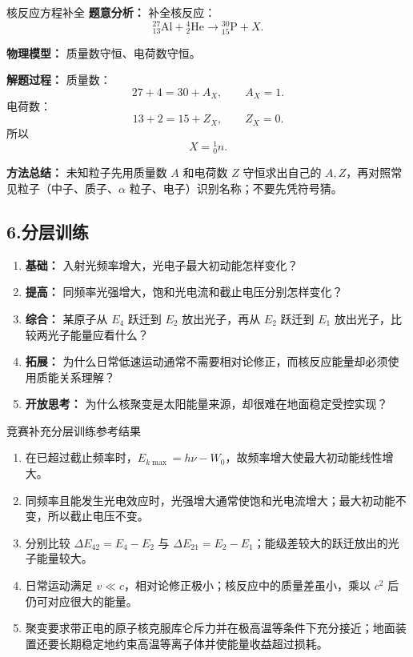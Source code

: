 \begin{examplebox}{核反应方程补全}
\textbf{题意分析：} 补全核反应：
\[
{}^{27}_{13}\mathrm{Al}+{}^4_2\mathrm{He}\rightarrow{}^{30}_{15}\mathrm{P}+X.
\]

\textbf{物理模型：} 质量数守恒、电荷数守恒。

\textbf{解题过程：}
质量数：
\[
27+4=30+A_X,\qquad A_X=1.
\]
电荷数：
\[
13+2=15+Z_X,\qquad Z_X=0.
\]
所以
\[
X={}^1_0n.
\]

\textbf{方法总结：} 未知粒子先用质量数 $A$ 和电荷数 $Z$ 守恒求出自己的 $A,Z$，再对照常见粒子（中子、质子、$\alpha$ 粒子、电子）识别名称；不要先凭符号猜。
\end{examplebox}

\subsection*{6.\quad 分层训练}

\begin{enumerate}
  \item \textbf{基础：} 入射光频率增大，光电子最大初动能怎样变化？
  \item \textbf{提高：} 同频率光强增大，饱和光电流和截止电压分别怎样变化？
  \item \textbf{综合：} 某原子从 $E_4$ 跃迁到 $E_2$ 放出光子，再从 $E_2$ 跃迁到 $E_1$ 放出光子，比较两光子能量应看什么？
  \item \textbf{拓展：} 为什么日常低速运动通常不需要相对论修正，而核反应能量却必须使用质能关系理解？
  \item \textbf{开放思考：} 为什么核聚变是太阳能量来源，却很难在地面稳定受控实现？
\end{enumerate}

\begin{learningbox}{竞赛补充分层训练参考结果}
\begin{enumerate}[itemsep=0.45em,topsep=0.3em,parsep=0pt]
  \item 在已超过截止频率时，$E_{k\max}=h\nu-W_0$，故频率增大使最大初动能线性增大。
  \item 同频率且能发生光电效应时，光强增大通常使饱和光电流增大；最大初动能不变，所以截止电压不变。
  \item 分别比较 $\Delta E_{42}=E_4-E_2$ 与 $\Delta E_{21}=E_2-E_1$；能级差较大的跃迁放出的光子能量较大。
  \item 日常运动满足 $v\ll c$，相对论修正极小；核反应中的质量差虽小，乘以 $c^2$ 后仍可对应很大的能量。
  \item 聚变要求带正电的原子核克服库仑斥力并在极高温等条件下充分接近；地面装置还要长期稳定地约束高温等离子体并使能量收益超过损耗。
\end{enumerate}
\end{learningbox}

